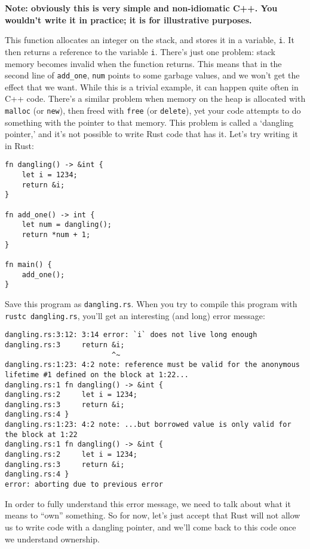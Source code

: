 \documentclass[]{article}
\begin{document}
\textbf{Note: obviously this is very simple and non-idiomatic C++. You
wouldn't write it in practice; it is for illustrative purposes.}

This function allocates an integer on the stack, and stores it in a
variable, \texttt{i}. It then returns a reference to the variable
\texttt{i}. There's just one problem: stack memory becomes invalid when
the function returns. This means that in the second line of
\texttt{add\_one}, \texttt{num} points to some garbage values, and we
won't get the effect that we want. While this is a trivial example, it
can happen quite often in C++ code. There's a similar problem when
memory on the heap is allocated with \texttt{malloc} (or \texttt{new}),
then freed with \texttt{free} (or \texttt{delete}), yet your code
attempts to do something with the pointer to that memory. This problem
is called a `dangling pointer,' and it's not possible to write Rust code
that has it. Let's try writing it in Rust:

\begin{verbatim}
fn dangling() -> &int {
    let i = 1234;
    return &i;
}

fn add_one() -> int {
    let num = dangling();
    return *num + 1;
}

fn main() {
    add_one();
}
\end{verbatim}

Save this program as \texttt{dangling.rs}. When you try to compile this
program with \texttt{rustc dangling.rs}, you'll get an interesting (and
long) error message:

\begin{verbatim}
dangling.rs:3:12: 3:14 error: `i` does not live long enough
dangling.rs:3     return &i;
                         ^~
dangling.rs:1:23: 4:2 note: reference must be valid for the anonymous lifetime #1 defined on the block at 1:22...
dangling.rs:1 fn dangling() -> &int {
dangling.rs:2     let i = 1234;
dangling.rs:3     return &i;
dangling.rs:4 }
dangling.rs:1:23: 4:2 note: ...but borrowed value is only valid for the block at 1:22
dangling.rs:1 fn dangling() -> &int {
dangling.rs:2     let i = 1234;
dangling.rs:3     return &i;
dangling.rs:4 }
error: aborting due to previous error
\end{verbatim}

In order to fully understand this error message, we need to talk about
what it means to ``own'' something. So for now, let's just accept that
Rust will not allow us to write code with a dangling pointer, and we'll
come back to this code once we understand ownership.
\end{document}
